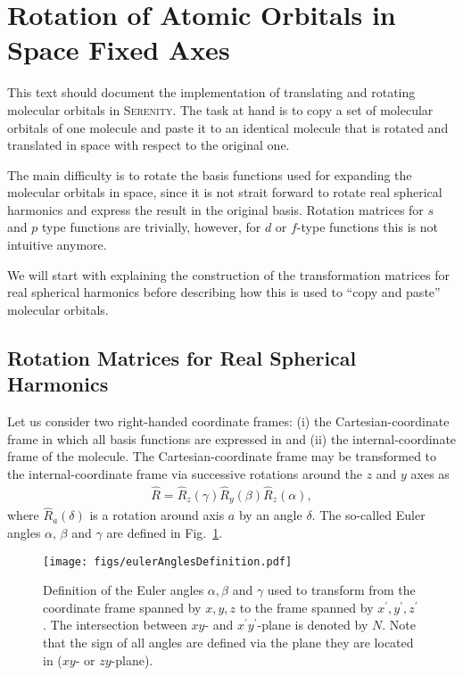 \section{Rotation of Atomic Orbitals in Space Fixed Axes}
This text should document the implementation of translating and rotating molecular orbitals in
\textsc{Serenity}. The task at hand is to copy a set of molecular orbitals of one molecule and paste
it to an identical molecule that is rotated and translated in space with respect to the original
one.

The main difficulty is to rotate the basis functions used for expanding the molecular orbitals in space,
since it is not strait forward to rotate real spherical harmonics and express the result in the original
basis. Rotation matrices for $s$ and $p$ type functions are trivially, however,
for $d$ or $f$-type functions this is not intuitive anymore.

We will start with explaining the construction of the transformation matrices for real spherical harmonics
before describing how this is used to ``copy and paste'' molecular orbitals.

\subsection{Rotation Matrices for Real Spherical Harmonics}

Let us consider two right-handed coordinate frames: (i) the Cartesian-coordinate frame in which all basis
functions are expressed in and (ii) the internal-coordinate frame of the molecule. The Cartesian-coordinate
frame may be transformed to the internal-coordinate frame via successive rotations around the $z$ and $y$
axes as
\begin{align}
  \hat{R} = \hat{R}_z(\gamma)\hat{R}_y(\beta)\hat{R}_z(\alpha),
\end{align}
where $\hat{R}_a(\delta)$ is a rotation around axis $a$ by an angle $\delta$. The so-called Euler angles $\alpha$, $\beta$ and $\gamma$ are defined in Fig.~\ref{fig:EulerAnglesDefinition}.

\begin{figure}
  \centering
  \texttt{[image: figs/eulerAnglesDefinition.pdf]}
  \caption{Definition of the Euler angles $\alpha,\beta$ and $\gamma$ used to transform from the coordinate
           frame spanned by $x,y,z$ to the frame spanned by $x^\prime,y^\prime,z^\prime$. The intersection
           between $xy$- and $x^\prime y^\prime $-plane is denoted by $N$. Note that the sign of all angles
           are defined via the plane they are located in ($xy$- or $zy$-plane).}
  \label{fig:EulerAnglesDefinition}
\end{figure}

